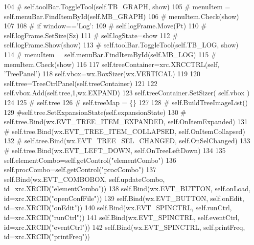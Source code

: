 \begin{DoxyCode}
104             \textcolor{comment}{#     self.toolBar.ToggleTool(self.TB\_GRAPH, show)}
105             \textcolor{comment}{#     menuItem = self.menuBar.FindItemById(self.MB\_GRAPH)}
106             \textcolor{comment}{#     menuItem.Check(show)}
107 
108             \textcolor{comment}{# if window=='Log':}
109             \textcolor{comment}{#     self.logFrame.Move(Pt)}
110             \textcolor{comment}{#     self.logFrame.SetSize(Sz)}
111             \textcolor{comment}{#     self.logState=show}
112             \textcolor{comment}{#     self.logFrame.Show(show)}
113             \textcolor{comment}{#     self.toolBar.ToggleTool(self.TB\_LOG, show)}
114             \textcolor{comment}{#     menuItem = self.menuBar.FindItemById(self.MB\_LOG)}
115             \textcolor{comment}{#     menuItem.Check(show)}
116                 
117         self.treeContainer=xrc.XRCCTRL(self, \textcolor{stringliteral}{'TreePanel'})
118         self.vbox=wx.BoxSizer(wx.VERTICAL)
119         
120         self.tree=TreeCtrlPanel(self.treeContainer)
121 
122         self.vbox.Add(self.tree,1,wx.EXPAND)
123         self.treeContainer.SetSizer( self.vbox )
124 
125 \textcolor{comment}{#        self.tree}
126 \textcolor{comment}{#        self.treeMap = \{\}}
127 
128 \textcolor{comment}{#        self.BuildTreeImageList()}
129         \textcolor{comment}{#self.tree.SetExpansionState(self.expansionState)}
130 \textcolor{comment}{#        self.tree.Bind(wx.EVT\_TREE\_ITEM\_EXPANDED, self.OnItemExpanded)}
131 \textcolor{comment}{#        self.tree.Bind(wx.EVT\_TREE\_ITEM\_COLLAPSED, self.OnItemCollapsed)}
132 \textcolor{comment}{#        self.tree.Bind(wx.EVT\_TREE\_SEL\_CHANGED, self.OnSelChanged)}
133 \textcolor{comment}{#        self.tree.Bind(wx.EVT\_LEFT\_DOWN, self.OnTreeLeftDown)}
134 
135         self.elementCombo=self.getControl(\textcolor{stringliteral}{"elementCombo"})
136         self.procCombo=self.getControl(\textcolor{stringliteral}{"procCombo"})
137         self.Bind(wx.EVT\_COMBOBOX, self.updateCombo, id=xrc.XRCID(\textcolor{stringliteral}{"elementCombo"}))        
138         self.Bind(wx.EVT\_BUTTON, self.onLoad, id=xrc.XRCID(\textcolor{stringliteral}{"openConfFile"}))
139         self.Bind(wx.EVT\_BUTTON, self.onEdit, id=xrc.XRCID(\textcolor{stringliteral}{"onEdit"}))
140         self.Bind(wx.EVT\_SPINCTRL, self.runCtrl, id=xrc.XRCID(\textcolor{stringliteral}{"runCtrl"}))
141         self.Bind(wx.EVT\_SPINCTRL, self.eventCtrl, id=xrc.XRCID(\textcolor{stringliteral}{"eventCtrl"}))
142         self.Bind(wx.EVT\_SPINCTRL, self.printFreq, id=xrc.XRCID(\textcolor{stringliteral}{"printFreq"}))

\end{DoxyCode}
